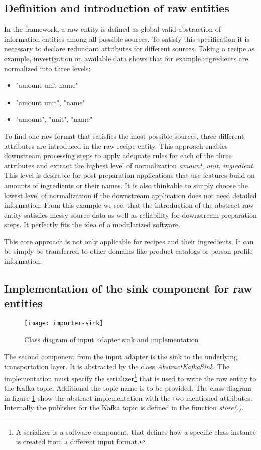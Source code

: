 \subsection{Definition and introduction of raw entities}
In the framework, a raw entity is defined as global valid abstraction of information entities among all possible sources. To satisfy this specification it is necessary to declare redundant attributes for different sources. Taking a recipe as example, investigation on available data shows that for example ingredients are normalized into three levels:
\begin{itemize}
\item "amount unit name"
\item "amount unit", "name"
\item "amount", "unit", "name"
\end{itemize}
To find one raw format that satisfies the most possible sources, three different attributes are introduced in the raw recipe entity. This approach enables downstream processing steps to apply adequate rules for each of the three attributes and extract the highest level of normalization \textit{amount}, \textit{unit}, \textit{ingredient}. This level is desirable for post-preparation applications that use features build on amounts of ingredients or their names. It is also thinkable to simply choose the lowest level of normalization if the downstream application does not need detailed information. From this example we see, that the introduction of the abstract raw entity satisfies messy source data as well as reliability for downstream preparation steps. It perfectly fits the idea of a modularized software.

This core approach is not only applicable for recipes and their ingredients. It can be simply be transferred to other domains like product catalogs or person profile information.

\subsection{Implementation of the sink component for raw entities}

\begin{figure}[htb]
  \centering
  \texttt{[image: importer-sink]}\\
  \caption{Class diagram of input adapter sink and implementation}
  \label{fig:importer-sink}
\end{figure}

The second component from the input adapter is the sink to the underlying transportation layer. It is abstracted by the class \textit{AbstractKafkaSink}. The implementation must specify the serializer\footnote{A serializer is a software component, that defines how a specific class instance is created from a different input format.} that is used to write the raw entity to the Kafka topic. Additional the topic name is to be provided. The class diagram in figure  \ref{fig:importer-sink} show the abstract implementation with the two mentioned attributes. Internally the publisher for the Kafka topic is defined in the function \textit{store(.)}.

